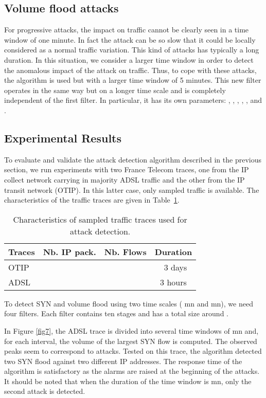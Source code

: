 \documentclass{amsart}
\begin{document}
\subsection{Volume flood attacks}

For  progressive attacks, the impact on  traffic cannot be clearly seen in
a time window of one minute. In fact the attack can be so slow that it could be  locally considered
as a normal traffic variation. This kind of attacks has typically a long duration. In this
situation, we  consider a larger time window in order to detect the anomalous impact of the
attack on  traffic. Thus,  to cope with these attacks, the algorithm
is used but with  a larger time window  of 5 minutes. This new filter operates
in the same way but on a longer time scale and is completely independent of the first
filter. In particular, it  has its own parameters: , , , , , and  . 

\subsection{Experimental Results}
To evaluate and validate the attack detection algorithm described in the previous section,  we run experiments with  two
France Telecom traces, one from the IP collect network carrying in majority ADSL traffic and the other from the IP transit network (OTIP). In this latter case, only
sampled traffic is available. The characteristics of the traffic traces are given in Table~\ref{charac}.   

\begin{table}[hbtp]
			\begin{center}
			\begin{tabular}{lccc}
			\hline
			Traces	 &  Nb. IP pack. &  Nb. Flows& Duration\\
			\hline
			OTIP	&	&	&~3 days\\
			ADSL &	& 	&3 hours\\
				
			\hline
			\end{tabular}
			\end{center}
			\caption{Characteristics of sampled traffic  traces used for attack detection. \label{charac}}
\end{table}



To detect SYN and volume flood using two time scales ( mn and  mn), we need
four filters. Each filter contains ten stages  and has a total size  around
. 

In Figure \ref{fig7},  the ADSL trace is  divided into several time windows  of  mn and,
for each interval, the volume of the largest SYN flow is computed. The observed peaks seem
to correspond to  attacks. Tested on this trace, the algorithm  detected two SYN flood
against two different IP addresses. The  response time of the algorithm is satisfactory as
the alarms are  raised at the beginning of  the attacks. It should be noted  that when the
duration of the time window is  mn, only the second attack is detected.
\end{document}
